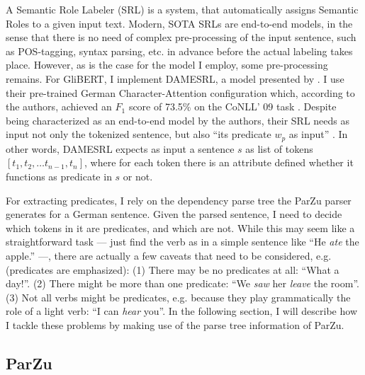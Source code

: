 A Semantic Role Labeler (SRL) is a system, that automatically
assigns Semantic Roles to a given input text. Modern, SOTA
SRLs are end-to-end models, in the sense that there is no
need of complex pre-processing of the input sentence, such as
POS-tagging, syntax parsing, etc. in advance before the actual
labeling takes place. However, as is the case for the model I
employ, some pre-processing remains. For GliBERT, I implement
DAMESRL, a model presented by \cite{do2018flexible}. I use
their pre-trained German Character-Attention configuration
which, according to the authors, achieved an $F_1$ score of
73.5\% on the CoNLL' 09 task \citep{hajivc2009conll}. Despite
being characterized as an end-to-end model by the authors,
their SRL needs as input not only the tokenized sentence, but
also ``its predicate $w_p$ as input'' \citep{do2018flexible}.
In other words, DAMESRL expects as input a sentence $s$ as
list of tokens $[ t_1, t_2, \dotsc t_{n-1}, t_n ]$, where for
each token there is an attribute defined whether it functions
as predicate in $s$ or not.

For extracting predicates, I rely on the dependency parse tree the ParZu parser
\cite{sennrich2013exploiting} generates for a German sentence. Given the parsed
sentence, I need to decide which tokens in it are predicates, and which are not.
While this may seem like a straightforward task --- just find the verb as in a
simple sentence like ``He \emph{ate} the apple.'' ---, there are actually a few
caveats that need to be considered, e.g. (predicates are emphasized): (1) There
may be no predicates at all: ``What a day!''. (2) There might be more than one
predicate: ``We \emph{saw} her \emph{leave} the room''. (3) Not all verbs might
be predicates, e.g. because they play grammatically the role of a light verb: ``I
can \emph{hear} you''. In the following section, I will describe how I tackle
these problems by making use of the parse tree information of ParZu.


\subsection{ParZu}


